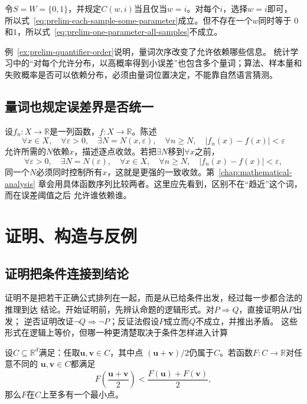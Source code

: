 \begin{example}[逐点可选不等于统一可选]
\label{ex:prelim-quantifier-order}
令$S=W=\{0,1\}$，并规定$C(w,i)$当且仅当$w=i$。对每个$i$，选择$w=i$即可，
所以式~\eqref{eq:prelim-each-sample-some-parameter}成立。但不存在一个$w$同时等于
$0$和$1$，所以式~\eqref{eq:prelim-one-parameter-all-samples}不成立。
\end{example}

例~\ref{ex:prelim-quantifier-order}说明，量词次序改变了允许依赖哪些信息。
统计学习中的“对每个允许分布，以高概率得到小误差”也包含多个量词；算法、样本量和
失败概率是否可以依赖分布，必须由量词位置决定，不能靠自然语言猜测。

\subsection{量词也规定误差界是否统一}

设$f_n:X\to\mathbb{R}$是一列函数，$f:X\to\mathbb{R}$。陈述
\[
  \forall x\in X,\quad
  \forall\varepsilon>0,\quad
  \exists N=N(x,\varepsilon),\quad
  \forall n\geq N,\quad
  |f_n(x)-f(x)|<\varepsilon
\]
允许所需的$N$依赖$x$，描述逐点收敛。若把$\exists N$移到$\forall x$之前，
\[
  \forall\varepsilon>0,\quad
  \exists N=N(\varepsilon),\quad
  \forall x\in X,\quad
  \forall n\geq N,\quad
  |f_n(x)-f(x)|<\varepsilon,
\]
同一个$N$必须同时控制所有$x$，这就是更强的一致收敛。第~\ref{chap:mathematical-analysis}
章会用具体函数序列比较两者。这里应先看到，区别不在“趋近”这个词，而在误差阈值之后
允许谁依赖谁。

\section{证明、构造与反例}
\label{sec:prelim-proofs-constructions-counterexamples}

\subsection{证明把条件连接到结论}

证明不是把若干正确公式排列在一起，而是从已给条件出发，经过每一步都合法的推理到达
结论。开始证明前，先辨认命题的逻辑形式。对$P\Rightarrow Q$，直接证明从$P$出发；
逆否证明改证$\neg Q\Rightarrow\neg P$；反证法假设$P$成立而$Q$不成立，并推出矛盾。
这些形式在逻辑上等价，但哪一种更清楚取决于条件怎样进入计算

\begin{theorem}[严格中点条件保证至多一个最小点]
\label{thm:prelim-strict-midpoint-unique-minimizer}
设$C\subseteq\mathbb{R}^d$满足：任取$\bm{u},\bm{v}\in C$，其中点
$(\bm{u}+\bm{v})/2$仍属于$C$。若函数$F:C\to\mathbb{R}$对任意不同的
$\bm{u},\bm{v}\in C$都满足
\begin{equation}
  F\left(\frac{\bm{u}+\bm{v}}{2}\right)
  <
  \frac{F(\bm{u})+F(\bm{v})}{2},
  \label{eq:prelim-strict-midpoint-condition}
\end{equation}
那么$F$在$C$上至多有一个最小点。
\end{theorem}

